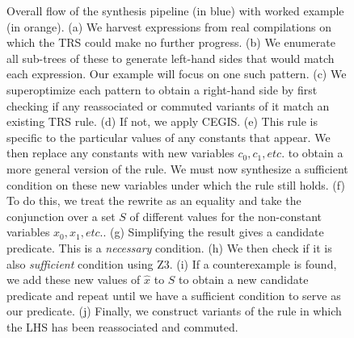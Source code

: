 \documentclass[acmsmall,review]{acmart}\settopmatter{printfolios=true,printccs=false,printacmref=false}
\begin{document}
\begin{figure}
  \caption{Overall flow of the synthesis pipeline (in blue) with worked example (in orange). (a) We harvest expressions from real compilations on which the TRS could make no further progress. (b) We enumerate all sub-trees of these to generate left-hand sides that would match each expression. Our example will focus on one such pattern. (c) We superoptimize each pattern to obtain a right-hand side by first checking if any reassociated or commuted variants of it match an existing TRS rule. (d) If not, we apply CEGIS. (e) This rule is specific to the particular values of any constants that appear. We then replace any constants with new variables $c_0, c_1, etc.$ to obtain a more general version of the rule. We must now synthesize a sufficient condition on these new variables under which the rule still holds. (f) To do this, we treat the rewrite as an equality and take the conjunction over a set $S$ of different values for the non-constant variables $x_0, x_1, etc.$. (g) Simplifying the result gives a candidate predicate. This is a \emph{necessary} condition. (h) We then check if it is also \emph{sufficient} condition using Z3. (i) If a counterexample is found, we add these new values of $\hat{x}$ to $S$ to obtain a new candidate predicate and repeat until we have a sufficient condition to serve as our predicate. (j) Finally, we construct variants of the rule in which the LHS has been reassociated and commuted.}
\label{fig:synthesis-flow}
\end{figure}
\end{document}
